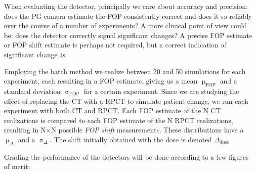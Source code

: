 \documentclass[a4paper,english]{article}
\begin{document}
When evaluating the detector, principally we care about accuracy and precision: does the PG camera estimate the FOP consistently correct and does it so reliably over the course of a number of experiments? A more clinical point of view could be: does the detector correctly signal significant changes? A precise FOP estimate or FOP shift estimate is perhaps not required, but a correct indication of significant change \emph{is}.

Employing the batch method we realize between 20 and 50 simulations for each experiment, each resulting in a FOP estimate, giving us a mean $\upmu_\textrm{FOP}$ and a standard deviation $\upsigma_\textrm{FOP}$ for a certain experiment. Since we are studying the effect of replacing the CT with a RPCT to simulate patient change, we run each experiment with both CT and RPCT. Each FOP estimate of the N CT realizations is compared to each FOP estimate of the N RPCT realizations, resulting in N$\times$N possible \emph{FOP shift} measurements. These distributions have a $\upmu_\Delta$ and a $\upsigma_\Delta$. The shift initially obtained with the dose is denoted $\Delta_\textrm{dose}$


Grading the performance of the detectors will be done according to a few figures of merit: 
\end{document}
